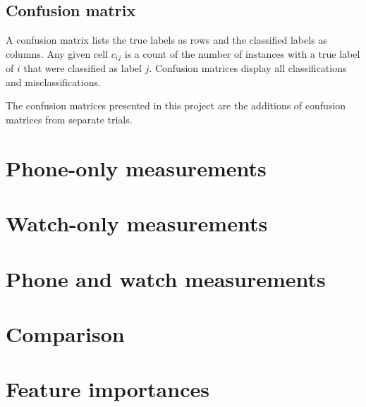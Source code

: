     \subsection{Confusion matrix}
      A confusion matrix lists the true labels as rows and the classified labels as columns. Any given cell $c_{ij}$ is a count of the number of instances with a true label of $i$ that were classified as label $j$. Confusion matrices display all classifications and misclassifications.
      
      The confusion matrices presented in this project are the additions of confusion matrices from separate trials.
    
  
  \section{Phone-only measurements}
  
  \section{Watch-only measurements}
  
  \section{Phone and watch measurements}
  
  \section{Comparison} 
  
  \section{Feature importances}
